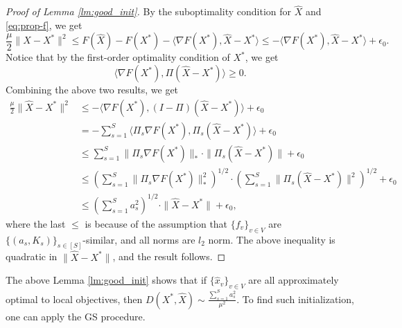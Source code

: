\documentclass[10pt]{article}
\begin{document}
\begin{proof}[Proof of Lemma \ref{lm:good_init}]
    By the suboptimality condition for $\widehat{X}$ and \eqref{eq:prop-f}, we get
    \begin{displaymath}
        \frac{\mu}{2}\|\widehat{X} - X^*\|^2\leq F(\widehat{X}) - F(X^*) - \langle \nabla F(X^*),\widehat{X} - X^*\rangle \leq - \langle \nabla F(X^*),\widehat{X} - X^*\rangle + \epsilon_0. 
    \end{displaymath}
    Notice that by the first-order optimality condition of $X^*$, we get
    \begin{displaymath}
        \langle \nabla F(X^*), \Pi (\widehat{X} -X^*)\rangle \geq 0.
    \end{displaymath}
    Combining the above two results, we get 
    \begin{align*}
        \frac{\mu}{2}\|\widehat{X} - X^*\|^2&\leq - \langle \nabla F(X^*),(I-\Pi)(\widehat{X} - X^*) \rangle + \epsilon_0\\
        &=- \sum_{s=1}^S \langle \Pi_s\nabla F(X^*),\Pi_s(\widehat{X} - X^*)\rangle + \epsilon_0\\
        &\leq \sum_{s=1}^S \|\Pi_s\nabla F(X^*)\|_*\cdot \|\Pi_s(\widehat{X} - X^*) \| + \epsilon_0\\
        &\leq (\sum_{s=1}^S \|\Pi_s\nabla F(X^*)\|^2_*)^{1/2}\cdot (\sum_{s=1}^S\|\Pi_s(\widehat{X} - X^*) \|^2)^{1/2} + \epsilon_0\\
        &\leq (\sum_{s=1}^S a_s^2)^{1/2}\cdot \|\widehat{X} - X^*\| + \epsilon_0,
    \end{align*}
where the last $\leq$ is because of the assumption that $\{f_v\}_{v\in V}$ are $\{(a_s,K_s)\}_{s\in [S]}$-similar, and all norms are $l_2$ norm. The above inequality is quadratic in $\|\widehat{X} - X^*\|$, and the result follows. 
\end{proof}


The above Lemma \ref{lm:good_init} shows that if $\{\widehat{x}_v\}_{v\in V}$ are all approximately optimal to local objectives, then $D(X^*,\widehat{X})\sim \frac{\sum_{s=1}^S a_s^2}{\mu^2}$. To find such initialization, one can apply the GS procedure. 
\end{document}
